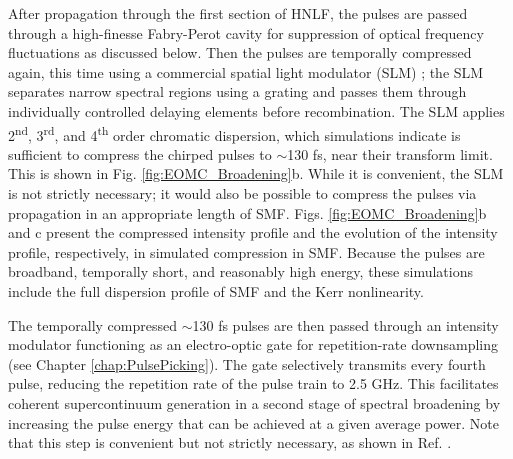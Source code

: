 After propagation through the first section of HNLF, the pulses are passed through a high-finesse Fabry-Perot cavity for suppression of optical frequency fluctuations as discussed below. Then the pulses are temporally compressed again, this time using a commercial spatial light modulator (SLM) \cite{Weiner2000}; the SLM separates narrow spectral regions using a grating and passes them through individually controlled delaying elements before recombination. The SLM applies 2\textsuperscript{nd}, 3\textsuperscript{rd}, and 4\textsuperscript{th} order chromatic dispersion, which simulations indicate is sufficient to compress the chirped pulses to $\sim$130 fs, near their transform limit. This is shown in Fig. \ref{fig:EOMC_Broadening}b. While it is convenient, the SLM is not strictly necessary; it would also be possible to compress the pulses via propagation in an appropriate length of SMF. Figs. \ref{fig:EOMC_Broadening}b and c present the compressed intensity profile and the evolution of the intensity profile, respectively, in simulated compression in SMF. Because the pulses are broadband, temporally short, and reasonably high energy, these simulations include the full dispersion profile of SMF and the Kerr nonlinearity.



The temporally compressed $\sim$130 fs pulses are then passed through an intensity modulator functioning as an electro-optic gate for repetition-rate downsampling (see Chapter \ref{chap:PulsePicking}). The gate selectively transmits every fourth pulse, reducing the repetition rate of the pulse train to 2.5 GHz. This facilitates coherent supercontinuum generation in a second stage of spectral broadening by increasing the pulse energy that can be achieved at a given average power. Note that this step is convenient but not strictly necessary, as shown in Ref. \cite{Beha2017}. 

